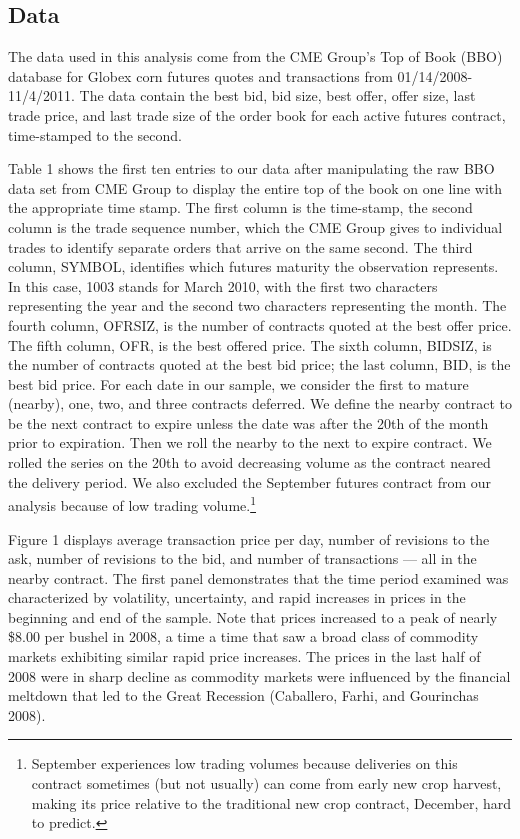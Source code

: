 \documentclass[review,12pt]{elsarticle}
\begin{document}
\begin{linenumbers}
\section{Data}\label{data}

The data used in this analysis come from the CME Group's Top of Book
(BBO) database for Globex corn futures quotes and transactions from
01/14/2008-11/4/2011. The data contain the best bid, bid size, best
offer, offer size, last trade price, and last trade size of the order
book for each active futures contract, time-stamped to the second.

Table 1 shows the first ten entries to our data after manipulating the
raw BBO data set from CME Group to display the entire top of the book on
one line with the appropriate time stamp. The first column is the
time-stamp, the second column is the trade sequence number, which the
CME Group gives to individual trades to identify separate orders that
arrive on the same second. The third column, SYMBOL, identifies which
futures maturity the observation represents. In this case, 1003 stands
for March 2010, with the first two characters representing the year and
the second two characters representing the month. The fourth column,
OFRSIZ, is the number of contracts quoted at the best offer price. The
fifth column, OFR, is the best offered price. The sixth column, BIDSIZ,
is the number of contracts quoted at the best bid price; the last
column, BID, is the best bid price. For each date in our sample, we
consider the first to mature (nearby), one, two, and three contracts
deferred. We define the nearby contract to be the next contract to
expire unless the date was after the 20th of the month prior to
expiration. Then we roll the nearby to the next to expire contract. We
rolled the series on the 20th to avoid decreasing volume as the contract
neared the delivery period. We also excluded the September futures
contract from our analysis because of low trading volume.\footnote{September
  experiences low trading volumes because deliveries on this contract
  sometimes (but not usually) can come from early new crop harvest,
  making its price relative to the traditional new crop contract,
  December, hard to predict.}

Figure 1 displays average transaction price per day, number of revisions
to the ask, number of revisions to the bid, and number of transactions
--- all in the nearby contract. The first panel demonstrates that the
time period examined was characterized by volatility, uncertainty, and
rapid increases in prices in the beginning and end of the sample. Note
that prices increased to a peak of nearly \$8.00 per bushel in 2008, a
time a time that saw a broad class of commodity markets exhibiting
similar rapid price increases. The prices in the last half of 2008 were
in sharp decline as commodity markets were influenced by the financial
meltdown that led to the Great Recession (Caballero, Farhi, and
Gourinchas 2008).


\end{linenumbers}
\end{document}
